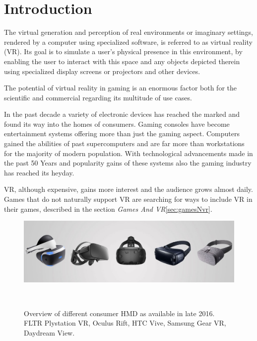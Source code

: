 \section{Introduction}

The virtual generation and perception of real environments or imaginary settings, rendered by a computer using specialized software, is referred to as virtual reality (VR). Its goal is to simulate a user's physical presence in this environment, by enabling the user to interact with this space and any objects depicted therein using specialized display screens or projectors and other devices.

The potential of virtual reality in gaming is an enormous factor both for the scientific and commercial regarding its multitude of use cases. 

In the past decade a variety of electronic devices has reached the marked and found its way into the homes of consumers. Gaming consoles have become entertainment systems offering more than just the gaming aspect. Computers gained the abilities of past supercomputers and are far more than workstations for the majority of modern population. With technological advancements made in the past 50 Years and popularity gains of these systems also the gaming industry has reached its heyday. 

VR, although expensive, gains more interest and the audience grows almost daily. 
Games that do not naturally support VR are searching for ways to include VR in their games, described in the section \textit{Games And VR}\ref{sec:gamesNvr}.

\begin{figure}%
	\centering
	\includegraphics[width=0.99\columnwidth]{./figures/vr-hmd}
	\caption[vr-hmd]{Overview of different consumer HMD as available in late 2016. FLTR Plystation VR, Oculus Rift, HTC Vive, Samsung Gear VR, Daydream View.\footnotemark}~\label{fig:vrHMD}
\end{figure}

